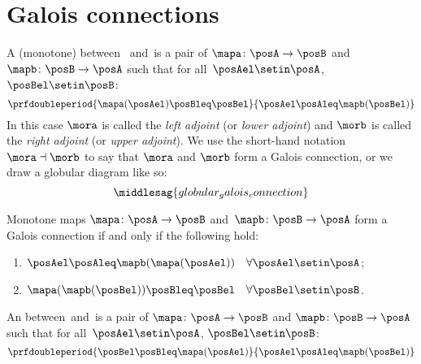 \section{Galois connections}\label{sec:galois-connections}


\begin{ctdefinition}\label{def:monotone-galois-connection}
    A (monotone)  between ~\posA and~\posB is a pair of 
    $\mapa\colon \posA\to \posB$ and~$\mapb\colon \posB\to \posA$ such that for all~$\posAel\setin \posA$,~$\posBel\setin \posB$:
    \begin{equation}
        \prfdoubleperiod{\mapa(\posAel) \posBleq \posBel}{\posAel \posAleq \mapb(\posBel)}
    \end{equation}
    In this case $\mora$ is called the \emph{left adjoint} (or \emph{lower adjoint}) and $\morb$ is called the \emph{right adjoint} (or \emph{upper adjoint}).
    We use the short-hand notation $\mora \dashv \morb$ to say that $\mora$ and $\morb$ form a Galois connection, or we draw a globular diagram like so:
    \begin{equation}
        \middlesag{globular_galois_connection}
    \end{equation}
\end{ctdefinition}

\begin{lemma}\label{lem:alternative-def-Galois-connection}
    Monotone maps $\mapa\colon \posA\to \posB$ and~$\mapb\colon \posB\to \posA$ form a Galois connection if and only if the following hold:
    \begin{enumerate}
        \item $\posAel\posAleq \mapb(\mapa(\posAel)) \quad \forall \posAel\setin \posA$;
        \item $\mapa(\mapb(\posBel)) \posBleq \posBel \quad \forall \posBel\setin \posB$.
    \end{enumerate}
\end{lemma}

\begin{ctdefinition}\label{def:antitone-galois-connection}
    An  between~\posA and~\posB is a pair of  $\mapa\colon \posA\to \posB$ and $\mapb \colon \posB\to \posA$ such that for all~$\posAel\setin \posA$, $\posBel\setin \posB$:
    \begin{equation}
        \prfdoubleperiod{\posBel \posBleq \mapa(\posAel)}{\posAel \posAleq \mapb(\posBel)}
    \end{equation}
\end{ctdefinition}

